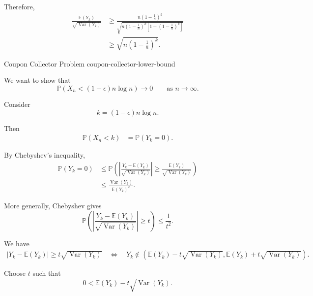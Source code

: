 Therefore,
\[
\begin{aligned}
    \frac{\mathbb{E}(Y_k)}
    {\sqrt{\operatorname{Var}(Y_k)}}
    &\geq
    \frac{
        n\left(1-\frac{1}{n}\right)^k
    }{
        \sqrt{
            n\left(1-\frac{1}{n}\right)^k
            \left[
                1-\left(1-\frac{1}{n}\right)^k
            \right]
        }
    } \\
    &\geq
    \sqrt{
        n\left(1-\frac{1}{n}\right)^k
    }.
\end{aligned}
\]

\begin{question}
{Coupon Collector Problem}
{coupon-collector-lower-bound}

We want to show that
\[
    \mathbb{P}
    \left(
        X_n
        <
        (1-\epsilon)n\log n
    \right)
    \longrightarrow 0
    \qquad\text{as }n\to\infty.
\]

Consider
\[
    k=(1-\epsilon)n\log n.
\]

Then
\[
\begin{aligned}
    \mathbb{P}(X_n<k)
    &=
    \mathbb{P}(Y_k=0).
\end{aligned}
\]

By Chebyshev's inequality,
\[
\begin{aligned}
    \mathbb{P}(Y_k=0)
    &\leq
    \mathbb{P}
    \left(
        \left|
        \frac{Y_k-\mathbb{E}(Y_k)}
        {\sqrt{\operatorname{Var}(Y_k)}}
        \right|
        \geq
        \frac{\mathbb{E}(Y_k)}
        {\sqrt{\operatorname{Var}(Y_k)}}
    \right) \\
    &\leq
    \frac{
        \operatorname{Var}(Y_k)
    }{
        \mathbb{E}(Y_k)^2
    }.
\end{aligned}
\]

More generally, Chebyshev gives
\[
    \mathbb{P}
    \left(
        \left|
        \frac{Y_k-\mathbb{E}(Y_k)}
        {\sqrt{\operatorname{Var}(Y_k)}}
        \right|
        \geq t
    \right)
    \leq
    \frac{1}{t^2}.
\]

We have
\[
\begin{aligned}
    \left|
        Y_k-\mathbb{E}(Y_k)
    \right|
    \geq
    t\sqrt{\operatorname{Var}(Y_k)}
    \quad\Longleftrightarrow\quad
    Y_k
    \notin
    \left(
        \mathbb{E}(Y_k)
        -
        t\sqrt{\operatorname{Var}(Y_k)},
        \mathbb{E}(Y_k)
        +
        t\sqrt{\operatorname{Var}(Y_k)}
    \right).
\end{aligned}
\]

Choose $t$ such that
\[
    0<
    \mathbb{E}(Y_k)
    -
    t\sqrt{\operatorname{Var}(Y_k)}.
\]


\end{question}
